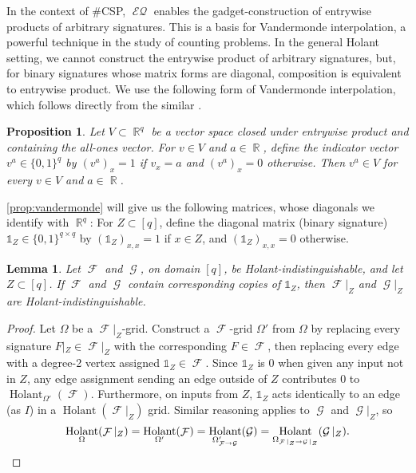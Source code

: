 \documentclass{article}
\newtheorem{proposition}{Proposition}[section]
\newtheorem{lemma}{Lemma}[section]
\theoremstyle{remark}
\theoremstyle{definition}
\DeclareMathOperator{\rr}{\mathbb{R}}
\DeclareMathOperator{\fc}{\mathcal{F}}
\DeclareMathOperator{\gc}{\mathcal{G}}
\DeclareMathOperator{\holant}{Holant}
\DeclareMathOperator{\eq}{\mathcal{EQ}}
\begin{document}
In the context of \#CSP, $\eq$ enables the gadget-construction of entrywise 
products of arbitrary signatures. This is a basis for Vandermonde interpolation, a powerful 
technique in the study of counting problems.
In the general Holant setting, we cannot construct the entrywise product of arbitrary signatures,
but, for binary signatures whose matrix forms are diagonal, composition is equivalent to entrywise
product. We use the following form of Vandermonde interpolation, which follows directly from the similar
\cite[Lemma 2.3]{grohe_homomorphism_2022}.
\begin{proposition}
    \label{prop:vandermonde}
    Let $V \subset \rr^q$ be a vector space closed under entrywise product and containing the
    all-ones vector. For $v \in V$ and $a \in \rr$, define the indicator vector $v^a \in \{0,1\}^q$ by
    $(v^a)_x = 1$ if $v_x = a$ and $(v^a)_x = 0$ otherwise. Then $v^a \in V$ for every
    $v \in V$ and $a \in \rr$.
\end{proposition}
\autoref{prop:vandermonde} will give us the following matrices, whose diagonals we identify
with $\rr^q$:
For $Z \subset [q]$, define the diagonal matrix (binary signature)
$\mathds{1}_Z \in \{0,1\}^{q \times q}$ by $(\mathds{1}_Z)_{x,x} = 1$ if $x \in Z$, and $(\mathds{1}_Z)_{x,x} = 0$ otherwise.
\begin{lemma}
    \label{lem:restriction}
    Let $\fc$ and $\gc$, on domain $[q]$, be Holant-indistinguishable, and let $Z \subset [q]$. If $\fc$ and
    $\gc$ contain corresponding copies of $\mathds{1}_Z$, then $\fc|_Z$ and $\gc|_Z$ are 
    Holant-indistinguishable.
\end{lemma}
\begin{proof}
    Let $\Omega$ be a $\fc|_Z$-grid.
    Construct a $\fc$-grid $\Omega'$ from $\Omega$ by replacing every signature
    $F|_Z \in \fc|_Z$ with the corresponding $F \in \fc$, then replacing every edge with a degree-2 vertex
    assigned 
    $\mathds{1}_Z \in \fc$. Since $\mathds{1}_Z$ is 0 when given any input not in $Z$,
    any edge assignment sending an edge outside of $Z$ contributes 0 to
    $\holant_{\Omega'}(\fc)$. Furthermore, on inputs from $Z$, $\mathds{1}_Z$ acts identically to an 
    edge (as $I$) in a $\holant(\fc|_Z)$ grid.
    Similar reasoning applies to $\gc$ and $\gc|_Z$, so
    \[
        \holant_{\Omega}(\fc|_Z) = \holant_{\Omega'}(\fc) = \holant_{\Omega'_{\fc\to\gc}}(\gc) 
        =\holant_{\Omega_{\fc|_Z\to\gc|_Z}}(\gc|_Z). \qedhere
    \]
\end{proof}
\end{document}

